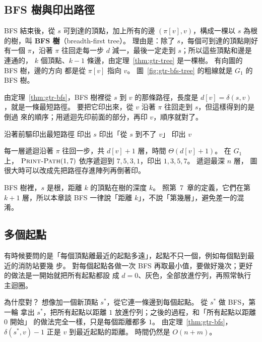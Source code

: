 \subsection{BFS 樹與印出路徑}

BFS 結束後，從 $s$ 可到達的頂點，加上所有的邊 $(\pi[v], v)$，構成一棵以 $s$ 為根的樹，叫
\textbf{BFS 樹}（breadth-first tree）。 理由是：除了 $s$，每個可到達的頂點剛好有一個
$\pi$，沿著 $\pi$ 往回走每一步 $d$ 減一，最後一定走到 $s$；所以這些頂點和邊是連通的，
$k$ 個頂點、$k - 1$ 條邊，由定理~\ref{thm:gtr-tree} 是一棵樹。 有向圖的 BFS 樹，邊的方向
都是從 $\pi[v]$ 指向 $v$。 圖~\ref{fig:gtr-bfs-tree} 的粗線就是 $G_1$ 的 BFS 樹。

由定理~\ref{thm:gtr-bfs}，BFS 樹裡從 $s$ 到 $v$ 的那條路徑，長度是 $d[v] = \delta(s,
v)$，就是一條最短路徑。 要把它印出來，從 $v$ 沿著 $\pi$ 往回走到 $s$，但這樣得到的是倒過
來的順序；用遞迴先印前面的部分，再印 $v$，順序就對了。

\begin{pseudo}[label=alg:gtr-path]{沿著前驅印出最短路徑}
        \State 印出 $s$
    \ElsIf{$\pi[v] = \NIL$}
        \State 印出「從 $s$ 到不了 $v$」
    \Else
        \State {}
        \State 印出 $v$
    \EndIf
\EndProcedure
\end{pseudo}

每一層遞迴沿著 $\pi$ 往回一步，共 $d[v] + 1$ 層，時間 $\Theta(d[v] + 1)$。 在 $G_1$ 上，
$\proc{Print-Path}(1, 7)$ 依序遞迴到 $7, 5, 3, 1$，印出 $1, 3, 5, 7$。 遞迴最深 $n$ 層，
圖很大時可以改成先把路徑存進陣列再倒著印。

BFS 樹裡，$s$ 是根，距離 $k$ 的頂點在樹的深度 $k$。 照第~7~章的定義，它們在第 $k + 1$
層，所以本章談 BFS 一律說「距離 $k$」，不說「第幾層」，避免差一的混淆。

\subsection{多個起點}
\label{sec:gtr-multi-source}

有時候要問的是「每個頂點離最近的起點多遠」，起點不只一個，例如每個點到最近的消防站要幾
步。 對每個起點各做一次 BFS 再取最小值，要做好幾次；更好的做法是一開始就把所有起點都設
成 $d = 0$、灰色，全部放進佇列，再照常執行主迴圈。

為什麼對？ 想像加一個新頂點 $s^{*}$，從它連一條邊到每個起點。 從 $s^{*}$ 做 BFS，第一輪
拿出 $s^{*}$，把所有起點以距離 $1$ 放進佇列；之後的過程，和「所有起點以距離 $0$ 開始」
的做法完全一樣，只是每個距離都多 $1$。 由定理~\ref{thm:gtr-bfs}，$\delta(s^{*}, v) - 1$
正是 $v$ 到最近起點的距離。 時間仍然是 $O(n + m)$。

